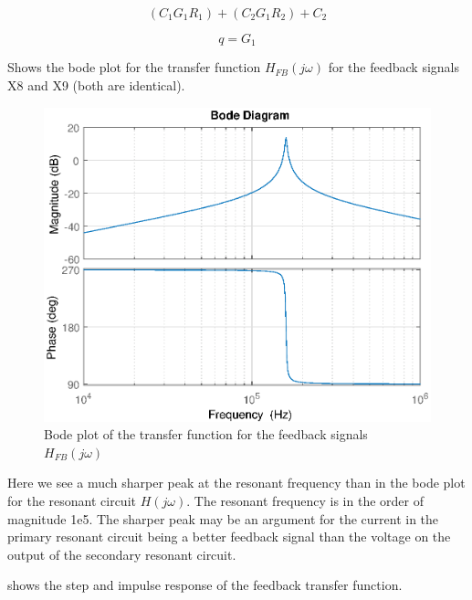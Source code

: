 \begin{equation} \label{eq:}
    (C_1 G_1 R_1) + (C_2 G_1 R_2) + C_2
\end{equation}

\begin{equation} \label{eq:fb_q}
    q = G_1
\end{equation}

 Shows the bode plot for the transfer function $H_{FB}(j\omega)$ for the feedback signals X8 and X9 (both are identical).

\begin{figure}[h]
    \centering
    \includegraphics[width=\textwidth]{img/FeedbackBode.eps}
    \caption{Bode plot of the transfer function for the feedback signals $H_{FB}(j\omega)$}
    \label{fig:fb_bode}
\end{figure}

Here we see a much sharper peak at the resonant frequency than in the bode plot for the resonant circuit $H(j\omega)$. The resonant frequency is in the order of magnitude 1e5. The sharper peak may be an argument for the current in the primary resonant circuit being a better feedback signal than the voltage on the output of the secondary resonant circuit.

\newpage
{} shows the step and impulse response of the feedback transfer function.

